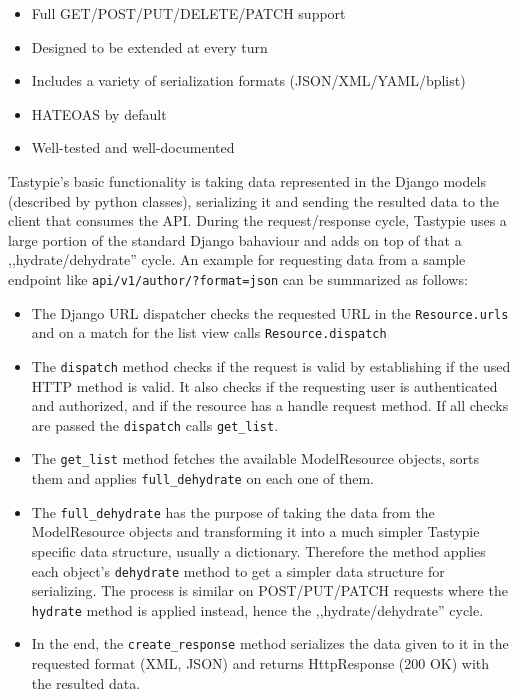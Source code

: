 \begin{itemize}
	\item Full GET/POST/PUT/DELETE/PATCH support
	\item Designed to be extended at every turn
	\item Includes a variety of serialization formats (JSON/XML/YAML/bplist)
	\item HATEOAS by default
	\item Well-tested and well-documented
\end{itemize}

Tastypie's basic functionality is taking data represented in the Django models (described by python classes), serializing it and sending the resulted data to the client that consumes the API. During the request/response cycle, Tastypie uses a large portion of the standard Django bahaviour and adds on top of that a ,,hydrate/dehydrate'' cycle. An example for requesting data from a sample endpoint like \texttt{api/v1/author/?format=json} can be summarized as follows:

\begin{itemize}
	\item The Django URL dispatcher checks the requested URL in the \texttt{Resource.urls} and on a match for the list view calls \texttt{Resource.dispatch}
	\item The \texttt{dispatch} method checks if the request is valid by establishing if the used HTTP method is valid. It also checks if the requesting user is authenticated and authorized, and if the resource has a handle  request method. If all checks are passed the \texttt{dispatch} calls \texttt{get\_list}.
	\item The \texttt{get\_list} method fetches the available ModelResource objects, sorts them and applies \texttt{full\_dehydrate} on each one of them.
	\item The \texttt{full\_dehydrate} has the purpose of taking the data from the ModelResource objects and transforming it into a much simpler Tastypie specific data structure, usually a dictionary. Therefore the method applies each object's  \texttt{dehydrate} method to get a simpler data structure for serializing. The process is similar on  POST/PUT/PATCH requests where the \texttt{hydrate} method is applied instead, hence the ,,hydrate/dehydrate'' cycle.
	\item In the end, the \texttt{create\_response} method serializes the data given to it in the requested format (XML, JSON) and returns HttpResponse (200 OK) with the resulted data.
\end{itemize}

